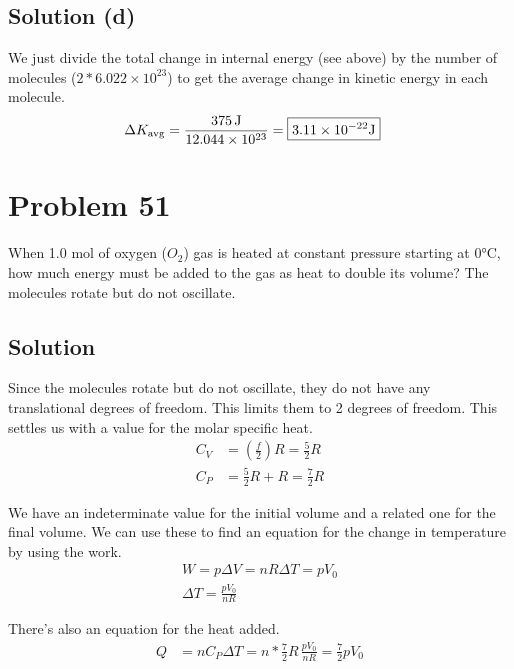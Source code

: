\documentclass[12pt]{article}
\newcommand{\E}[1]{\times 10^{#1}}
\begin{document}
        \subsection{Solution (d)}
            We just divide the total change in internal energy (see above) by the number of molecules ($2 * 6.022\E{23}$) to get the average change in kinetic energy in each molecule.
            \begin{align}
                \Delta K_{\rm avg}  &=  \frac{375\,\unit{\joule}}{12.044\E{23}}
                    =   \boxed{3.11\E{-22}\unit{\joule}}
            \end{align}

    \pagebreak
    \section{Problem 51}
        When 1.0 mol of oxygen ($O_2$) gas is heated at constant pressure starting at 0°C, how much energy must be added to the gas as heat to double its volume? 
        The molecules rotate but do not oscillate.

        \subsection{Solution}
            Since the molecules rotate but do not oscillate, they do not have any translational degrees of freedom.
            This limits them to 2 degrees of freedom.
            This settles us with a value for the molar specific heat.
            \begin{align}
                C_V &=  \left( \frac{f}{2} \right)R 
                    =   \frac{5}{2}R\\
                C_P &=  \frac{5}{2}R + R
                    =   \frac{7}{2}R
            \end{align}

            We have an indeterminate value for the initial volume and a related one for the final volume.
            We can use these to find an equation for the change in temperature by using the work.
            \begin{gather}
                W   =   p\Delta V = nR\Delta T = pV_0\\
                \Delta T    =   \frac{pV_0}{nR}
            \end{gather}

            There's also an equation for the heat added.
            \begin{align}
                Q   &=  nC_P \Delta T
                    =   n * \frac{7}{2}R\,\frac{pV_0}{nR}
                    =   \frac{7}{2} pV_0
            \end{align}
\end{document}
